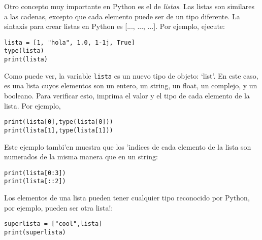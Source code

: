 \documentclass[11pt]{exam}
\begin{document}
\firstpageheadrule
\runningheadrule
{}
\cfoot{ }
\begin{flushleft}
\vspace{0.2in}

\vspace{0.25cm}
\end{flushleft}

\begin{questions}

\item Otro concepto muy importante en Python es el de \textit{listas}. Las listas son  similares a las cadenas, excepto que cada elemento puede ser de un tipo diferente. La sintaxis para crear listas en Python es [..., ..., ...]. Por ejemplo, ejecute:

\begin{verbatim}
lista = [1, "hola", 1.0, 1-1j, True]
type(lista)
print(lista)
\end{verbatim}

Como puede ver, la variable \texttt{lista} es un nuevo tipo de objeto: `list'. En este caso, es una lista cuyos elementos son un entero, un string, un float, un complejo, y un booleano. Para verificar esto, imprima el valor y el tipo de cada elemento de la lista. Por ejemplo,

\begin{verbatim}
print(lista[0],type(lista[0]))
print(lista[1],type(lista[1]))
\end{verbatim}

Este ejemplo tambi'en muestra que los 'indices de cada elemento de la lista son numerados de la misma manera que en un string:

\begin{verbatim}
print(lista[0:3])
print(lista[::2])
\end{verbatim}

\item Los elementos de una lista pueden tener cualquier tipo reconocido por Python, por ejemplo, pueden ser otra lista!:

\begin{verbatim}
superlista = ["cool",lista]
print(superlista)
\end{verbatim}


\end{questions}
\end{document}
